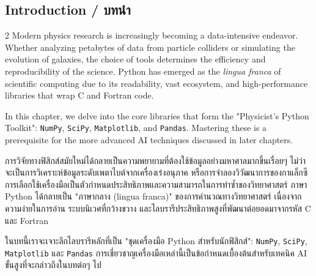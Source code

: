 \subsection{Introduction \quad / \quad \textthai{บทนำ}}
\begin{paracol}{2}
Modern physics research is increasingly becoming a data-intensive endeavor. Whether analyzing petabytes of data from particle colliders or simulating the evolution of galaxies, the choice of tools determines the efficiency and reproducibility of the science. Python has emerged as the \textit{lingua franca} of scientific computing due to its readability, vast ecosystem, and high-performance libraries that wrap C and Fortran code.

In this chapter, we delve into the core libraries that form the "Physicist's Python Toolkit": \texttt{NumPy}, \texttt{SciPy}, \texttt{Matplotlib}, and \texttt{Pandas}. Mastering these is a prerequisite for the more advanced AI techniques discussed in later chapters.

\switchcolumn

\begin{thai}
การวิจัยทางฟิสิกส์สมัยใหม่ได้กลายเป็นความพยายามที่ต้องใช้ข้อมูลอย่างมหาศาลมากขึ้นเรื่อยๆ ไม่ว่าจะเป็นการวิเคราะห์ข้อมูลระดับเพตาไบต์จากเครื่องเร่งอนุภาค หรือการจำลองวิวัฒนาการของกาแล็กซี การเลือกใช้เครื่องมือเป็นตัวกำหนดประสิทธิภาพและความสามารถในการทำซ้ำของวิทยาศาสตร์ ภาษา Python ได้กลายเป็น "ภาษากลาง (lingua franca)" ของการคำนวณทางวิทยาศาสตร์ เนื่องจากความง่ายในการอ่าน ระบบนิเวศที่กว้างขวาง และไลบรารีประสิทธิภาพสูงที่พัฒนาต่อยอดมาจากรหัส C และ Fortran

ในบทนี้เราจะเจาะลึกไลบรารีหลักที่เป็น "ชุดเครื่องมือ Python สำหรับนักฟิสิกส์": \texttt{NumPy}, \texttt{SciPy}, \texttt{Matplotlib} และ \texttt{Pandas} การเชี่ยวชาญเครื่องมือเหล่านี้เป็นข้อกำหนดเบื้องต้นสำหรับเทคนิค AI ขั้นสูงที่จะกล่าวถึงในบทต่อๆ ไป
\end{thai}
\end{paracol}
